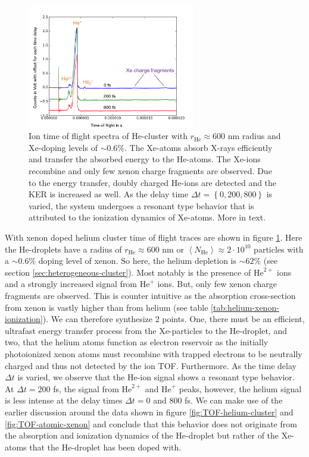 \begin{figure}
	\centering
		\includegraphics[width=0.65\textwidth]{images/results/TOF-helium-xenon-cluster-60.png}
	\caption[TOF spectra of HeXe-cluster with $\sim 0.6\%$ Xe-doping at various delays $\Delta t$.]{Ion time of flight spectra of He-cluster with $r_{\text{He}}\approx 600$ nm radius and Xe-doping levels of $\sim 0.6\%$. The Xe-atoms absorb X-rays efficiently and transfer the absorbed energy to the He-atoms. The Xe-ions recombine and only few xenon charge fragments are observed. Due to the energy transfer, doubly charged He-ions are detected and the KER is increased as well. As the delay time $\Delta t=\left\{0,200,800\right\}$ is varied, the system undergoes a resonant type behavior that is attributed to the ionization dynamics of Xe-atoms. More in text.}
	\label{fig:TOF-helium-xenon-cluster-60}
\end{figure}
With xenon doped helium cluster time of flight traces are shown in figure \ref{fig:TOF-helium-xenon-cluster-60}. Here the He-droplets have a radius of $r_{\text{He}}\approx 600$ nm or $\left\langle N_{\text{He}}\right\rangle\approx 2\cdot 10^{10}$ particles with a $\sim 0.6\%$ doping level of xenon. So here, the helium depletion is $\sim 62\%$ (see section \ref{sec:heterogeneous-cluster}). Most notably is the presence of $\text{He}^{2+}$ ions and a strongly increased signal from $\text{He}^{+}$ ions. But, only few xenon charge fragments are observed. This is counter intuitive as the absorption cross-section from xenon is vastly higher than from helium (see table \ref{tab:helium-xenon-ionization}). We can therefore synthesize 2 points. One, there must be an efficient, ultrafast energy transfer process from the Xe-particles to the He-droplet, and two, that the helium atoms function as electron reservoir as the initially photoionized xenon atoms must recombine with trapped electrons to be neutrally charged and thus not detected by the ion TOF. Furthermore. As the time delay $\Delta t$ is varied, we observe that the He-ion signal shows a resonant type behavior. At $\Delta t = 200$ fs, the signal from $\text{He}^{2+}$ and $\text{He}^{+}$ peaks, however, the helium signal is less intense at the delay times $\Delta t = 0$ and 800 fs. We can make use of the earlier discussion around the data shown in figure \ref{fig:TOF-helium-cluster} and \ref{fig:TOF-atomic-xenon} and conclude that this behavior does not originate from the absorption and ionization dynamics of the He-droplet but rather of the Xe-atoms that the He-droplet has been doped with.\\
